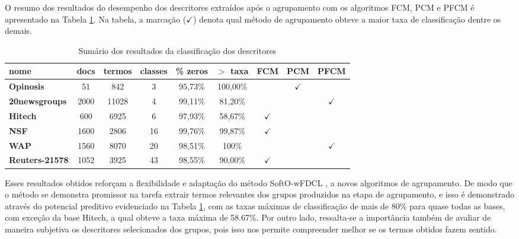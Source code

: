 O resumo dos resultados do desempenho dos descritores extraídos após o agrupamento com os
algoritmos FCM, PCM e PFCM é apresentado na Tabela \ref{table:pfcmsummary}. Na tabela, a marcação
($\checkmark$) denota qual método de agrupamento obteve a maior taxa de classificação dentre os
demais.

\begin{table}[!htp]
  \centering
  \begin{tabular}{ |l|c c c c c c c c|}
    \hline
    {\bf nome} & docs & termos & classes & \% zeros & $>$ taxa & FCM & PCM & PFCM \\
    \hline
    {\bf Opinosis} & 51 & 842 & 3 & 95,73\% & 100,00\% & & $\checkmark$ &  \\
    \hline
    {\bf 20newsgroups} & 2000 & 11028 & 4 & 99,11\% & 81,20\% & & & $\checkmark$\\
    \hline
    {\bf Hitech} & 600 & 6925 & 6 & 97,93\% & 58,67\% & $\checkmark$ & & \\
    \hline
    {\bf NSF} & 1600 & 2806 & 16 & 99,76\% & 99,87\% & $\checkmark$ & & \\
    \hline
    {\bf WAP} & 1560 & 8070 & 20 & 98,51\% & 100\% & & & $\checkmark$ \\
    \hline
    {\bf Reuters-21578} & 1052 & 3925 & 43 & 98,55\% & 90,00\% & $\checkmark$ & & \\
    \hline
  \end{tabular}
  \caption{Sumário dos resultados da classificação dos descritores}
  \label{table:pfcmsummary}
\end{table}

Esses resultados obtidos reforçam a flexibilidade e adaptação do método SoftO-wFDCL
\cite{Nogueira2013}, a novos algoritmos de agrupamento. De modo que o método se demonstra promissor
na tarefa extrair termos relevantes dos grupos produzidos na etapa de agrupamento, e isso é
demonstrado através do potencial preditivo evidenciado na Tabela \ref{table:pfcmsummary}, com as
taxas máximas de classificação de mais de 80\% para quase todas as bases, com exceção da base
Hitech, a qual obteve a taxa máxima de 58.67\%.  Por outro lado, ressalta-se a importância também de
avaliar de maneira subjetiva os descritores selecionados dos grupos, pois isso nos permite
compreender melhor se os termos obtidos fazem sentido. 

